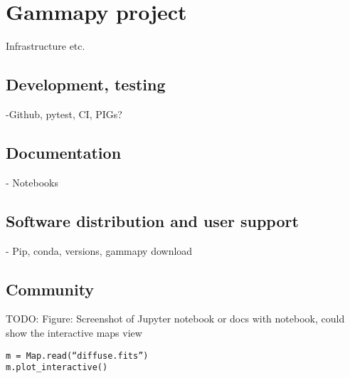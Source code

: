 \section{Gammapy project}
\label{sec:project}

Infrastructure etc.

\subsection{Development, testing}

-Github, pytest, CI, PIGs?

\subsection{Documentation}

- Notebooks

\subsection{Software distribution and user support}

- Pip, conda, versions, gammapy download

\subsection{Community}

TODO: Figure: Screenshot of Jupyter notebook or docs with notebook, could show the interactive maps view
\begin{verbatim}
m = Map.read(“diffuse.fits”)
m.plot_interactive()        
\end{verbatim}
